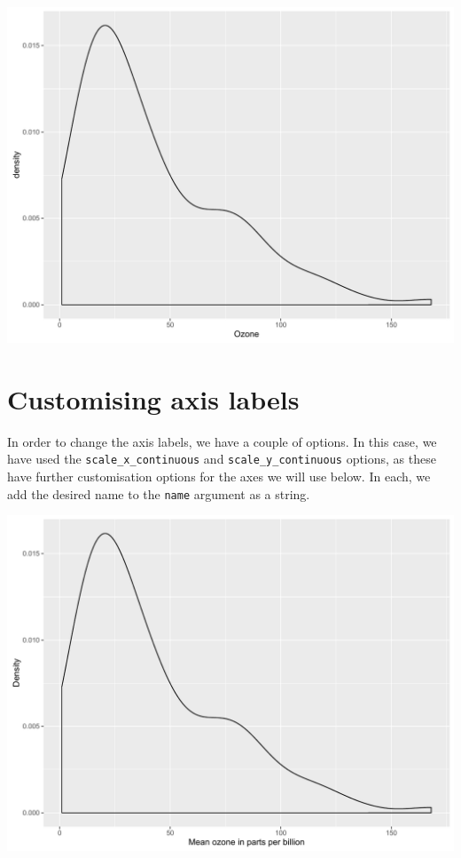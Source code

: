 \begin{center}\includegraphics[width=0.55\linewidth]{figures/density_1-1} \end{center}

\section{Customising axis labels}\label{customising-axis-labels-1}

In order to change the axis labels, we have a couple of options. In this
case, we have used the \texttt{scale\_x\_continuous} and
\texttt{scale\_y\_continuous} options, as these have further
customisation options for the axes we will use below. In each, we add
the desired name to the \texttt{name} argument as a string.

\begin{Shaded}
\begin{Highlighting}[]
\StringTok{ }\StringTok{ }\NormalTok{(} \NormalTok{) +}
\StringTok{      }\NormalTok{(} \NormalTok{)}
\end{Highlighting}
\end{Shaded}

\begin{center}\includegraphics[width=0.55\linewidth]{figures/density_2-1} \end{center}

